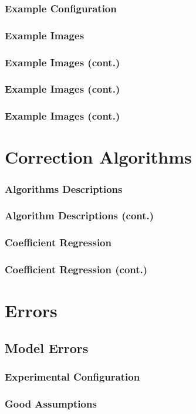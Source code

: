\documentclass[red]{beamer}
\begin{document}
\begin{frame}
	\frametitle{Example Configuration}
\end{frame}

\begin{frame}
	\frametitle{Example Images}
\end{frame}

\begin{frame}
	\frametitle{Example Images (cont.)}
\end{frame}

\begin{frame}
	\frametitle{Example Images (cont.)}
\end{frame}

\begin{frame}
	\frametitle{Example Images (cont.)}
\end{frame}

\section{Correction Algorithms}
\begin{frame}
	\frametitle{Algorithms Descriptions}
\end{frame}

\begin{frame}
	\frametitle{Algorithm Descriptions (cont.)}
\end{frame}

\begin{frame}
	\frametitle{Coefficient Regression}
\end{frame}

\begin{frame}
	\frametitle{Coefficient Regression (cont.)}
\end{frame}

\section{Errors}
\subsection{Model Errors}
\begin{frame}
	\frametitle{Experimental Configuration}
\end{frame}

\begin{frame}
	\frametitle{Good Assumptions}
\end{frame}
\end{document}
